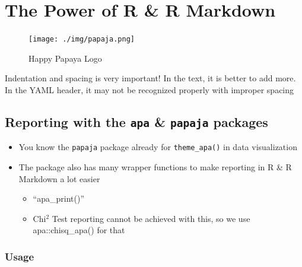 \documentclass[
]{book}
\providecommand{\tightlist}{%
  \setlength{\itemsep}{0pt}\setlength{\parskip}{0pt}}
\begin{document}
\chapter{The Power of R \& R Markdown}\label{the-power-of-r-r-markdown}

\begin{figure}
\centering
\texttt{[image: ./img/papaja.png]}
\caption{Happy Papaya Logo}
\end{figure}

Indentation and spacing is very important!
In the text, it is better to add more.
In the YAML header, it may not be recognized properly with improper spacing

\section{\texorpdfstring{Reporting with the \texttt{apa} \& \texttt{papaja} packages}{Reporting with the apa \& papaja packages}}\label{reporting-with-the-apa-papaja-packages}

\begin{itemize}
\tightlist
\item
  You know the \texttt{papaja} package already for \texttt{theme\_apa()} in data visualization
\item
  The package also has many wrapper functions to make reporting in R \& R Markdown a lot easier

  \begin{itemize}
  \tightlist
  \item
    ``apa\_print()''
  \item
    Chi\(^2\) Test reporting cannot be achieved with this, so we use apa::chisq\_apa() for that
  \end{itemize}
\end{itemize}

\subsection{Usage}\label{usage}
\end{document}
